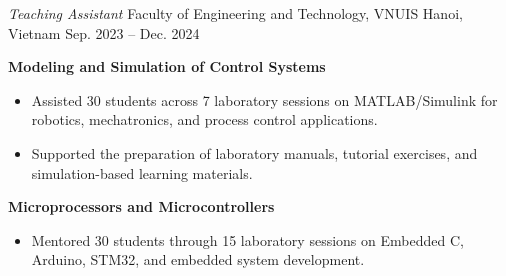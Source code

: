 
\begin{cventries}
  {\fontsize{8.8pt}{1.15em}\selectfont
  \cventry
    {\textit{Teaching Assistant}}
    {Faculty of Engineering and Technology, VNUIS}
    {Hanoi, Vietnam}
    {Sep. 2023 -- Dec. 2024}
    {
      \begin{cvitems}
        \item {\textbf{Modeling and Simulation of Control Systems}}
        \begin{itemize}[leftmargin=1.8em, itemsep=0pt, topsep=0.1em, parsep=0pt]
          \item Assisted 30 students across 7 laboratory sessions on MATLAB/Simulink for robotics, mechatronics, and process control applications.
          \item Supported the preparation of laboratory manuals, tutorial exercises, and simulation-based learning materials.
        \end{itemize}
        \item {\textbf{Microprocessors and Microcontrollers}}
        \begin{itemize}[leftmargin=1.8em, itemsep=0pt, topsep=0.1em, parsep=0pt]
          \item Mentored 30 students through 15 laboratory sessions on Embedded C, Arduino, STM32, and embedded system development.
        \end{itemize}
      \end{cvitems}
    }
  }
\end{cventries}